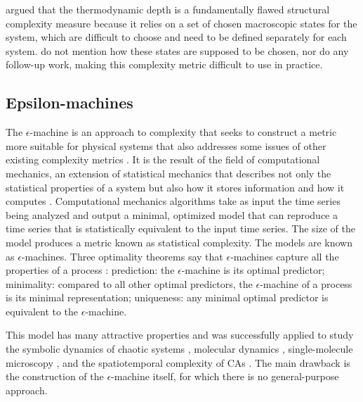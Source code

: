 \textcite{crutchfieldThermodynamicDepthCausal1999} argued that the thermodynamic
depth is a fundamentally flawed structural complexity measure because it relies
on a set of chosen macroscopic states for the system, which are difficult to
choose and need to be defined separately for each system.
\textcite{lloydComplexityThermodynamicDepth1988} do not mention how these states
are supposed to be chosen, nor do any follow-up work, making this complexity
metric difficult to use in practice.

\subsection{Epsilon-machines}

The $\epsilon$-machine is an approach to complexity that seeks to construct a metric
more suitable for physical systems that also addresses some issues of other
existing complexity metrics \parencite{crutchfieldOrderChaos2012}. It is the
result of the field of computational mechanics, an extension of statistical
mechanics that describes not only the statistical properties of a system but
also how it stores information and how it computes
\parencite{crutchfieldInferringStatisticalComplexity1989,
  crutchfieldCalculiEmergenceComputation1994,
  feldmanMeasuresStatisticalComplexity1998, crutchfieldOrderChaos2012}.
Computational mechanics algorithms take as input the time series being analyzed
and output a minimal, optimized model that can reproduce a time series that is
statistically equivalent to the input time series. The size of the model
produces a metric known as statistical complexity. The models are known as
$\epsilon$-machines. Three optimality theorems say that $\epsilon$-machines capture all the
properties of a process
\parencite{crutchfieldInferringStatisticalComplexity1989,
  crutchfieldThermodynamicDepthCausal1999,
  shaliziComputationalMechanicsPattern2001}: prediction: the $\epsilon$-machine is its
optimal predictor; minimality: compared to all other optimal predictors, the
$\epsilon$-machine of a process is its minimal representation; uniqueness: any minimal
optimal predictor is equivalent to the $\epsilon$-machine.

This model has many attractive properties and was successfully applied to study
the symbolic dynamics of chaotic systems
\parencite{crutchfieldCalculiEmergenceComputation1994}, molecular dynamics
\parencite{ryabovComputationalMechanicsMolecular2011}, single-molecule
microscopy \parencite{kellyNewMethodInferring2012}, and the spatiotemporal
complexity of \acp{CA} \parencite{crutchfieldTurbulentPatternBases1993,
  hansonComputationalMechanicsCellular1997,
  shaliziQuantifyingSelfOrganizationOptimal2004}. The main drawback is the
construction of the $\epsilon$-machine itself, for which there is no
general-purpose approach.

